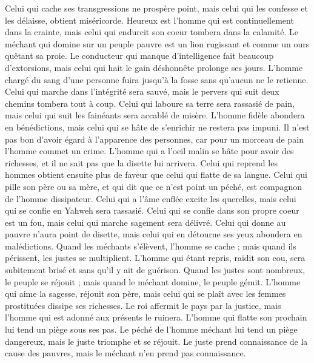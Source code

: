 \begin{multicols}{2}
Celui qui cache ses transgressions ne prospère point, mais celui qui les confesse et les délaisse, obtient miséricorde.
Heureux est l'homme qui est continuellement dans la crainte, mais celui qui endurcit son coeur tombera dans la calamité.
Le méchant qui domine sur un peuple pauvre est un lion rugissant et comme un ours quêtant sa proie.
Le conducteur qui manque d'intelligence fait beaucoup d'extorsions, mais celui qui hait le gain déshonnête prolonge ses jours.
L'homme chargé du sang d'une personne fuira jusqu'à la fosse sans qu'aucun ne le retienne.
Celui qui marche dans l'intégrité sera sauvé, mais le pervers qui suit deux chemins tombera tout à coup.
Celui qui laboure sa terre sera rassasié de pain, mais celui qui suit les fainéants sera accablé de misère.
L'homme fidèle abondera en bénédictions, mais celui qui se hâte de s'enrichir ne restera pas impuni.
Il n'est pas bon d'avoir égard à l'apparence des personnes, car pour un morceau de pain l'homme commet un crime.
L'homme qui a l'oeil malin se hâte pour avoir des richesses, et il ne sait pas que la disette lui arrivera.
Celui qui reprend les hommes obtient ensuite plus de faveur que celui qui flatte de sa langue.
Celui qui pille son père ou sa mère, et qui dit que ce n'est point un péché, est compagnon de l'homme dissipateur.
Celui qui a l’âme enflée excite les querelles, mais celui qui se confie en Yahweh sera rassasié.
Celui qui se confie dans son propre coeur est un fou, mais celui qui marche sagement sera délivré.
Celui qui donne au pauvre n'aura point de disette, mais celui qui en détourne ses yeux abondera en malédictions.
Quand les méchants s'élèvent, l'homme se cache ; mais quand ils périssent, les justes se multiplient.
\VerseOne{}L'homme qui étant repris, raidit son cou, sera subitement brisé et sans qu'il y ait de guérison.
Quand les justes sont nombreux, le peuple se réjouit ; mais quand le méchant domine, le peuple gémit.
L'homme qui aime la sagesse, réjouit son père, mais celui qui se plaît avec les femmes prostituées dissipe ses richesses.
Le roi affermit le pays par la justice, mais l'homme qui est adonné aux présents le ruinera.
L'homme qui flatte son prochain lui tend un piège sous ses pas.
Le péché de l'homme méchant lui tend un piège dangereux, mais le juste triomphe et se réjouit.
Le juste prend connaissance de la cause des pauvres, mais le méchant n'en prend pas connaissance.

\end{multicols}
